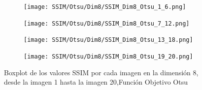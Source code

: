 \documentclass[conference]{IEEEtran}
\begin{document}
\begin{figure}
	\centering
	\begin{subfigure}{0.4\textwidth}
		\texttt{[image: SSIM/Otsu/Dim8/SSIM\_Dim8\_Otsu\_1\_6.png]}
	\end{subfigure}
	
	\begin{subfigure}{0.4\textwidth}
		\texttt{[image: SSIM/Otsu/Dim8/SSIM\_Dim8\_Otsu\_7\_12.png]}
	\end{subfigure}
	\begin{subfigure}{0.4\textwidth}
		\texttt{[image: SSIM/Otsu/Dim8/SSIM\_Dim8\_Otsu\_13\_18.png]}
	\end{subfigure}
	\begin{subfigure}{0.4\textwidth}
		\texttt{[image: SSIM/Otsu/Dim8/SSIM\_Dim8\_Otsu\_19\_20.png]}
		\vspace{-120pt} %
	\end{subfigure}
	\caption{Boxplot de los valores SSIM por cada imagen en la dimensión 8, desde la imagen 1 hasta la imagen 20,Función Objetivo Otsu}
	\label{fig:imagenes}    
\end{figure}
\end{document}
